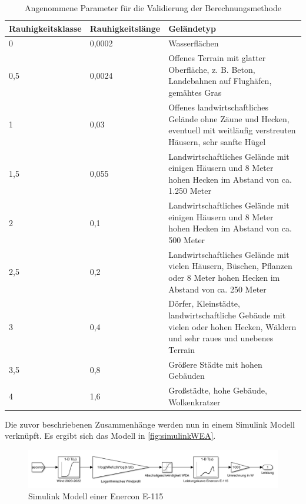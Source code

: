 \begin{table} [H]
	\begin{tabular}[htpb]{p{4cm}|p{3cm}|p{8cm}}
		\textbf{Rauhigkeitsklasse} & \textbf{Rauhigkeitslänge} & \textbf{Geländetyp} \\
		\hline
		0 & 0,0002 & Wasserflächen \\
		\hline
		0,5 & 0,0024 & Offenes Terrain mit glatter Oberfläche, z. B. Beton, Landebahnen auf Flughäfen, gemähtes Gras \\
		\hline
		1 & 0,03 & Offenes landwirtschaftliches Gelände ohne Zäune und Hecken, eventuell mit weitläufig verstreuten Häusern, sehr sanfte Hügel \\
		\hline
		1,5 & 0,055 & Landwirtschaftliches Gelände mit einigen Häusern und 8 Meter hohen Hecken im Abstand von ca. 1.250 Meter \\
		\hline
		2 & 0,1 & Landwirtschaftliches Gelände mit einigen Häusern und 8 Meter hohen Hecken im Abstand von ca. 500 Meter \\
		\hline
		2,5 & 0,2 & Landwirtschaftliches Gelände mit vielen Häusern, Büschen, Pflanzen oder 8 Meter hohen Hecken im Abstand von ca. 250 Meter \\
		\hline
		3 & 0,4 & Dörfer, Kleinstädte, landwirtschaftliche Gebäude mit vielen oder hohen Hecken, Wäldern und sehr raues und unebenes Terrain \\
		\hline
		3,5 & 0,8 & Größere Städte mit hohen Gebäuden \\
		\hline
		4 & 1,6 & Großstädte, hohe Gebäude, Wolkenkratzer \\
	\end{tabular}
\centering
\caption{Angenommene Parameter für die Validierung der Berechnungsmethode \cite{Rauigkeit}}
\label{tab:Rauigkeit}
\end{table}

Die zuvor beschriebenen Zusammenhänge werden nun in einem Simulink Modell verknüpft. Es ergibt sich das Modell in \autoref{fig:simulinkWEA}.

\begin{figure}[H]
	\centering
	\includegraphics[width=0.9\linewidth]{Abbildungen/ModellWEAeinfach.png}
	\caption{Simulink Modell einer Enercon E-115}
	\label{fig:simulinkWEA}
\end{figure}

